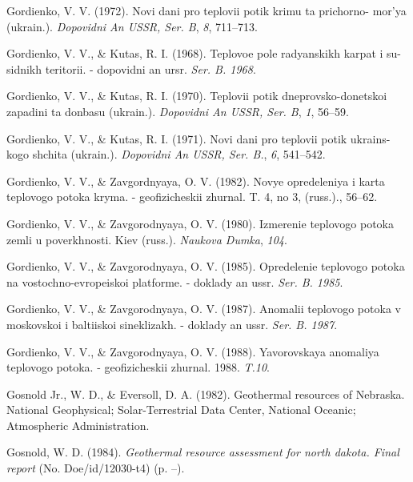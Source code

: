 \begin{CSLReferences}{1}{1}
\leavevmode{}%
Gordienko, V. V. (1972). Novi dani pro teplovii potik krimu ta prichorno- mor'ya (ukrain.). \emph{Dopovidni An USSR, Ser. B}, \emph{8}, 711--713.

\leavevmode{}%
Gordienko, V. V., \& Kutas, R. I. (1968). Teplovoe pole radyanskikh karpat i su- sidnikh teritorii. - dopovidni an ursr. \emph{Ser. B. 1968}.

\leavevmode{}%
Gordienko, V. V., \& Kutas, R. I. (1970). Teplovii potik dneprovsko-donetskoi zapadini ta donbasu (ukrain.). \emph{Dopovidni An USSR, Ser. B}, \emph{1}, 56--59.

\leavevmode{}%
Gordienko, V. V., \& Kutas, R. I. (1971). Novi dani pro teplovii potik ukrains- kogo shchita (ukrain.). \emph{Dopovidni An USSR, Ser. B.}, \emph{6}, 541--542.

\leavevmode{}%
Gordienko, V. V., \& Zavgordnyaya, O. V. (1982). Novye opredeleniya i karta teplovogo potoka kryma. - geofizicheskii zhurnal. T. 4, no 3, (russ.)., 56--62.

\leavevmode{}%
Gordienko, V. V., \& Zavgorodnyaya, O. V. (1980). Izmerenie teplovogo potoka zemli u poverkhnosti. Kiev (russ.). \emph{Naukova Dumka}, \emph{104}.

\leavevmode{}%
Gordienko, V. V., \& Zavgorodnyaya, O. V. (1985). Opredelenie teplovogo potoka na vostochno-evropeiskoi platforme. - doklady an ussr. \emph{Ser. B. 1985}.

\leavevmode{}%
Gordienko, V. V., \& Zavgorodnyaya, O. V. (1987). Anomalii teplovogo potoka v moskovskoi i baltiiskoi sineklizakh. - doklady an ussr. \emph{Ser. B. 1987}.

\leavevmode{}%
Gordienko, V. V., \& Zavgorodnyaya, O. V. (1988). Yavorovskaya anomaliya teplovogo potoka. - geofizicheskii zhurnal. 1988. \emph{T.10}.

\leavevmode{}%
Gosnold Jr., W. D., \& Eversoll, D. A. (1982). Geothermal resources of {Nebraska}. National Geophysical; Solar-Terrestrial Data Center, National Oceanic; Atmospheric Administration.

\leavevmode{}%
Gosnold, W. D. (1984). \emph{Geothermal resource assessment for north dakota. Final report} (No. Doe/id/12030-t4) (p. --).


\end{CSLReferences}
